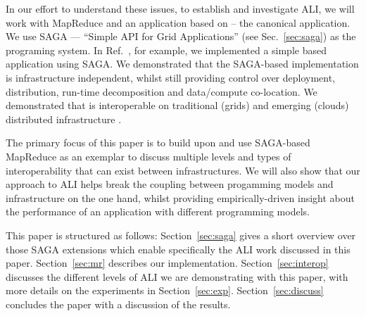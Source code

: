 \documentclass[3p,twocolumn]{elsarticle}
\begin{document}

In our effort to understand these issues, to establish and investigate
ALI, we will work with MapReduce and an application based on \mr --
the canonical \wc application.  We use SAGA --- “Simple API for Grid
Applications'' (see Sec.~\ref{sec:saga}) as the programing system.  In
Ref.~\cite{saga_ccgrid09}, for example, we implemented a simple \mr
based \wc application using SAGA.  We demonstrated that the SAGA-based
implementation is infrastructure independent, whilst still providing
control over deployment, distribution, run-time decomposition and
data/compute co-location.
We demonstrated that \sagamapreduce is interoperable on traditional
(grids) and emerging (clouds) distributed infrastructure
.  

The primary focus of this paper is to build upon and use SAGA-based
MapReduce as an exemplar to discuss multiple levels and types of
interoperability that can exist between infrastructures. We will
also show that our approach to ALI helps break the coupling between
progamming models and infrastructure on the one hand, whilst providing
empirically-driven insight about the performance of an application
with different programming models.



This paper is structured as follows: Section~\ref{sec:saga} gives a
short overview over those SAGA extensions which enable specifically
the ALI work discussed in this paper.  Section~\ref{sec:mr} describes
our \smr implementation.  Section~\ref{sec:interop} discusses the
different levels of ALI we are demonstrating with this paper, with
more details on the experiments in Section~\ref{sec:exp}.
Section~\ref{sec:discuss} concludes the paper with a discussion of the
results.
\end{document}

